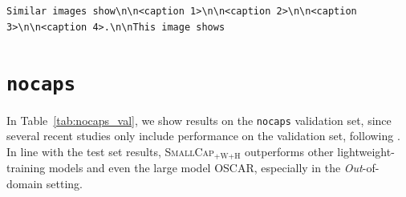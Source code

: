 \documentclass[10pt,twocolumn,letterpaper]{article}
\begin{document}
\noindent\texttt{Similar images show\textbackslash n\textbackslash n\texttt{<caption 1>}\textbackslash n\textbackslash n<caption 2>\textbackslash n\textbackslash n\texttt{<caption 3>}\textbackslash n\textbackslash n\texttt{<caption 4>}.\textbackslash n\textbackslash nThis image shows}








\section{\texttt{nocaps}}
\label{nocaps:val}

\begin{table}[!h]
     \caption{Validation results in CIDEr score on \texttt{nocaps}.  * Results copied from the respective publications. $\star$ Results computed by us. $\circ$ Results obtained through personal communication. }
     \label{tab:nocaps_val}
 \end{table}
In Table~\ref{tab:nocaps_val}, we show results on the \texttt{nocaps} validation set, since several recent studies only include performance on the validation set, following \cite{li2020oscar}. In line with the test set results, \textsc{SmallCap}$_{\text{+W+H}}$ outperforms other lightweight-training models and even the large model OSCAR, especially in the \textit{Out}-of-domain setting.
\end{document}
